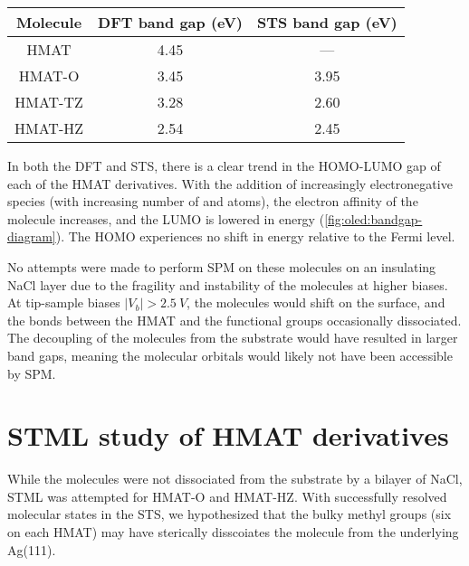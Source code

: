 \begin{table} [h]
\begin{center}
    \begin{tabular}{|c|c|c|} 
    \hline
        Molecule  &  DFT band gap (eV)  &  STS band gap (eV) \\
        \hline
        HMAT     &    4.45   &  --- \\
        HMAT-O   &    3.45   & 3.95 \\
        HMAT-TZ  &    3.28   & 2.60 \\
        HMAT-HZ  &    2.54   & 2.45 \\
        \hline
    \end{tabular}
    \caption{}
    \label{tab:oled:bandgaps}
    \end{center}
\end{table}

In both the \ac{DFT} and \ac{STS}, there is a clear trend in the HOMO-LUMO gap of each of the \ac{HMAT} derivatives. With the addition of increasingly electronegative species (with increasing number of  and  atoms), the electron affinity of the molecule increases, and the \ac{LUMO} is lowered in energy (\autoref{fig:oled:bandgap-diagram}). The \ac{HOMO} experiences no shift in energy relative to the Fermi level.

\begin{figure} [h]
    \centering
    \caption{}
    \label{fig:oled:bandgap-diagram}
\end{figure}

No attempts were made to perform \ac{SPM} on these molecules on an insulating NaCl layer due to the fragility and instability of the molecules at higher biases. At tip-sample biases $|V_b| > \SI{2.5}{V}$, the molecules would shift on the surface, and the bonds between the \ac{HMAT} and the functional groups occasionally dissociated. The decoupling of the molecules from the substrate would have resulted in larger band gaps, meaning the molecular orbitals would likely not have been accessible by \ac{SPM}.



\section{\ac{STML} study of HMAT derivatives}

While the molecules were not dissociated from the substrate by a bilayer of NaCl, \ac{STML} was attempted for \ac{HMAT-O} and \ac{HMAT-HZ}. With successfully resolved molecular states in the \ac{STS}, we hypothesized that the bulky methyl groups (six on each \ac{HMAT}) may have sterically disscoiates the molecule from the underlying Ag(111).

